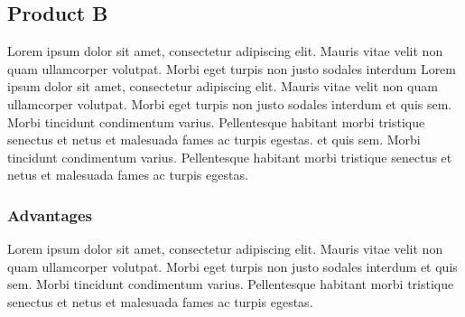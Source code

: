 \documentclass[11pt,titlepage]{article}
\begin{document}
\subsection{Product B}
Lorem ipsum dolor sit amet, consectetur adipiscing elit. Mauris vitae velit 
non quam ullamcorper volutpat. Morbi eget turpis non justo sodales interdum 
Lorem ipsum dolor sit amet, consectetur adipiscing elit. Mauris vitae velit 
non quam ullamcorper volutpat. Morbi eget turpis non justo sodales interdum 
et quis sem. Morbi tincidunt condimentum varius. Pellentesque habitant morbi 
tristique senectus et netus et malesuada fames ac turpis egestas.
et quis sem. Morbi tincidunt condimentum varius. Pellentesque habitant morbi 
tristique senectus et netus et malesuada fames ac turpis egestas.\newline
\subsubsection{Advantages}
Lorem ipsum dolor sit amet, consectetur adipiscing elit. Mauris vitae velit 
non quam ullamcorper volutpat. Morbi eget turpis non justo sodales interdum 
et quis sem. Morbi tincidunt condimentum varius. Pellentesque habitant morbi 
tristique senectus et netus et malesuada fames ac turpis egestas.\newline
\end{document}
